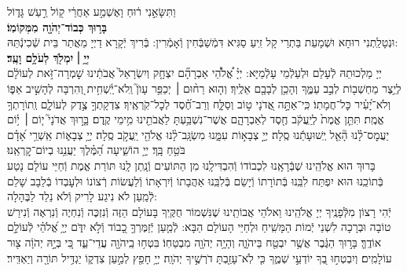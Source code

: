 \documentclass[twoside, openany, parskip=half, 11pt]{book}
\begin{document}
{וַתִּשָּׂאֵ֣נִי ר֔וּחַ וָאֶשְׁמַ֣ע אַחֲרַ֔י ק֖וֹל רַ֣עַשׁ גָּד֑וֹל\\
\textbf{בָּר֥וּךְ כְּבוֹד־יְהֹוָ֖ה מִמְּקוֹמֽוֹ׃} \\
וּנְטָלַֽתְנִי רוּחָא וּשְׁמָעֵת בַּתְרַי קָל זִֽיעַ סַגִּיא דִּמְֿשַׁבְּֿחִין וְֿאָמְֿרִין: בְּֿרִיךְ יְֿקָרָא דַיְיָ מֵאֲתַר בֵּית שְֿׁכִינְֿתֵּהּ:\\
\textbf{יְיָ֥ ׀ יִמְלֹ֖ךְ לְעֹלָ֥ם וָעֶֽד׃} \\
יְיָ מַלְכוּתֵהּ לְֿעָלַם וּלְעַלְֿמֵי עָלְֿמַיָּא: יְיָ֗
%
 אֱ֠לֹהֵ֠י אַבְרָהָ֞ם יִצְחָ֤ק וְיִשְׂרָאֵל֙ אֲבֹתֵ֔ינוּ שׇׁמְרָה־זֹּ֣את לְעוֹלָ֔ם לְיֵ֥צֶר מַחְשְׁב֖וֹת לְבַ֣ב עַמֶּ֑ךָ וְהָכֵ֥ן לְבָבָ֖ם אֵלֶֽיךָ׃ וְה֤וּא
%
 רַח֨וּם ׀ יְכַפֵּ֥ר עָוֺן֮ וְֽלֹא־יַֽ֫שְׁחִ֥ית וְ֭הִרְבָּה לְהָשִׁ֣יב אַפּ֑וֹ וְלֹא־יָ֝עִ֗יר כׇּל־חֲמָתֽוֹ׃  כִּֽי־אַתָּ֣ה
%
 אֲ֭דֹנָי ט֣וֹב וְסַלָּ֑ח וְרַב־חֶ֗֝סֶד לְכׇל־קֹֽרְאֶֽיךָ׃  צִדְקָתְךָ֣
%
 צֶ֣דֶק לְעוֹלָ֑ם וְֽתוֹרָתְךָ֥ אֱמֶֽת׃  תִּתֵּ֤ן
%
 אֱמֶת֙ לְיַֽעֲקֹ֔ב חֶ֖סֶד לְאַבְרָהָ֑ם אֲשֶׁר־נִשְׁבַּ֥עְתָּ לַאֲבֹתֵ֖ינוּ מִ֥ימֵי קֶֽדֶם׃  בָּ֤ר֣וּךְ
%
 אֲדֹנָי֮ י֤וֹם ׀ י֥֫וֹם יַעֲמׇס־לָ֗נוּ הָ֘אֵ֤ל יְֽשׁוּעָתֵ֬נוּ סֶֽלָה׃  יְיָ֣
%
 צְבָא֣וֹת עִמָּ֑נוּ מִשְׂגָּֽב־לָ֨נוּ אֱלֹהֵ֖י יַֽעֲקֹ֣ב סֶֽלָה׃ יְיָ֥
%
 צְבָא֑וֹת אַֽשְׁרֵ֥י אָ֝דָ֗ם בֹּטֵ֥חַ בָּֽךְ׃  יְיָ֥
%
הוֹשִׁ֑יעָה הַ֝מֶּ֗לֶךְ יַעֲנֵ֥נוּ בְיוֹם־קׇרְאֵֽנוּ׃  \\
בָּרוּךְ הוּא אֱלֹהֵֽינוּ שֶׁבְּֿרָאָֽנוּ לִכְבוֹדוֹ וְֿהִבְדִּילָֽנוּ מִן הַתּוֹעִים וְֿנָֽתַן לָֽנוּ תּוֹרַת אֱמֶת וְֿחַיֵּי עוֹלָם נָטַע בְּֿתוֹכֵֽנוּ הוּא יִפְתַּח לִבֵּֽנוּ בְּֿתוֹרָתוֹ וְֿיָשֵׂם בְּֿלִבֵּֽנוּ אַהֲבָתוֹ וְֿיִרְאָתוֹ וְֿלַעֲשׂוֹת רְֿצוֹנוֹ וּלְעׇבְדוֹ בְֿלֵבָב שָׁלֵם לְֿמַֽעַן לֹא נִיגַע לָרִיק וְֿלֹא נֵלֵד לַבֶּהָלָה:\\
יְֿהִי רָצוֹן מִלְּֿפָנֶֽיךָ יְיָ אֱלֹהֵֽינוּ וֵאלֹהֵי אֲבוֹתֵֽינוּ שֶׁנִּשְׁמוֹר חֻקֶּֽיךָ בָּעוֹלָם הַזֶּה וְֿנִזְכֶּה וְֿנִחְיֶה וְֿנִרְאֶה וְֿנִירַשׁ טוֹבָה וּבְרָכָה לִשְׁנֵי יְֿמוֹת הַמָּשִֽׁיחַ וּלְחַיֵּי הָעוֹלָם הַבָּא: לְֿמַ֤עַן יְֿזַמֶּרְךָ֣ כָ֭בוֹד וְֿלֹ֣א יִדֹּ֑ם יְיָ֥ אֱ֝לֹהַ֗י לְֿעוֹלָ֣ם אוֹדֶֽךָּ׃ בָּר֣וּךְ הַגֶּ֔בֶר אֲשֶׁ֥ר יִבְטַ֖ח בַּיהֹוָ֑ה וְהָיָ֥ה יְהֹוָ֖ה מִבְטַחֽוֹ׃ בִּטְח֥וּ
%
 בַֽיהֹוָ֖ה עֲדֵי־עַ֑ד כִּ֚י בְּיָ֣הּ יְהֹוָ֔ה צ֖וּר עוֹלָמִֽים׃ וְיִבְטְח֣וּ
%
 בְ֭ךָ יוֹדְעֵ֣י שְׁמֶ֑ךָ כִּ֤י לֹֽא־עָזַ֖בְתָּ דֹרְשֶׁ֣יךָ יְהֹוָֽה׃ יְיָ֥
%
חָפֵ֖ץ לְמַ֣עַן צִדְק֑וֹ יַגְדִּ֥יל תּוֹרָ֖ה וְיַאְדִּֽיר׃
}
\end{document}
